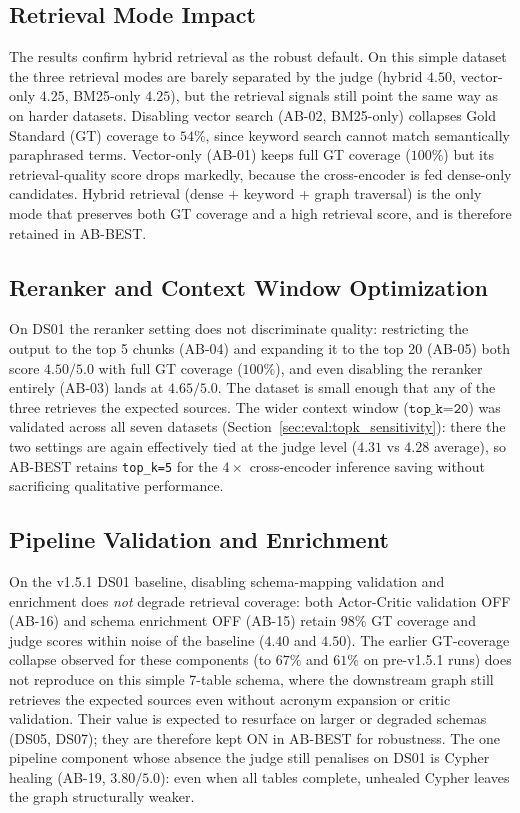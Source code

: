 \subsection{Retrieval Mode Impact}
\label{sec:eval:retrieval_impact}

The results confirm hybrid retrieval as the robust default. On this simple dataset the three retrieval modes are barely separated by the judge (hybrid $4.50$, vector-only $4.25$, BM25-only $4.25$), but the retrieval signals still point the same way as on harder datasets. Disabling vector search (AB-02, BM25-only) collapses Gold Standard (GT) coverage to $54\%$, since keyword search cannot match semantically paraphrased terms. Vector-only (AB-01) keeps full GT coverage ($100\%$) but its retrieval-quality score drops markedly, because the cross-encoder is fed dense-only candidates. Hybrid retrieval (dense + keyword + graph traversal) is the only mode that preserves both GT coverage and a high retrieval score, and is therefore retained in AB-BEST.

\subsection{Reranker and Context Window Optimization}
\label{sec:eval:reranker_impact}

On DS01 the reranker setting does not discriminate quality: restricting the output to the top 5 chunks (AB-04) and expanding it to the top 20 (AB-05) both score $4.50/5.0$ with full GT coverage ($100\%$), and even disabling the reranker entirely (AB-03) lands at $4.65/5.0$. The dataset is small enough that any of the three retrieves the expected sources. The wider context window ($\texttt{top\_k=20}$) was validated across all seven datasets (Section~\ref{sec:eval:topk_sensitivity}): there the two settings are again effectively tied at the judge level ($4.31$ vs $4.28$ average), so AB-BEST retains \texttt{top\_k=5} for the $4\times$ cross-encoder inference saving without sacrificing qualitative performance.

\subsection{Pipeline Validation and Enrichment}
\label{sec:eval:validation_impact}

On the v1.5.1 DS01 baseline, disabling schema-mapping validation and enrichment does \emph{not} degrade retrieval coverage: both Actor-Critic validation OFF (AB-16) and schema enrichment OFF (AB-15) retain $98\%$ GT coverage and judge scores within noise of the baseline ($4.40$ and $4.50$). The earlier GT-coverage collapse observed for these components (to $67\%$ and $61\%$ on pre-v1.5.1 runs) does not reproduce on this simple 7-table schema, where the downstream graph still retrieves the expected sources even without acronym expansion or critic validation. Their value is expected to resurface on larger or degraded schemas (DS05, DS07); they are therefore kept ON in AB-BEST for robustness. The one pipeline component whose absence the judge still penalises on DS01 is Cypher healing (AB-19, $3.80/5.0$): even when all tables complete, unhealed Cypher leaves the graph structurally weaker.

